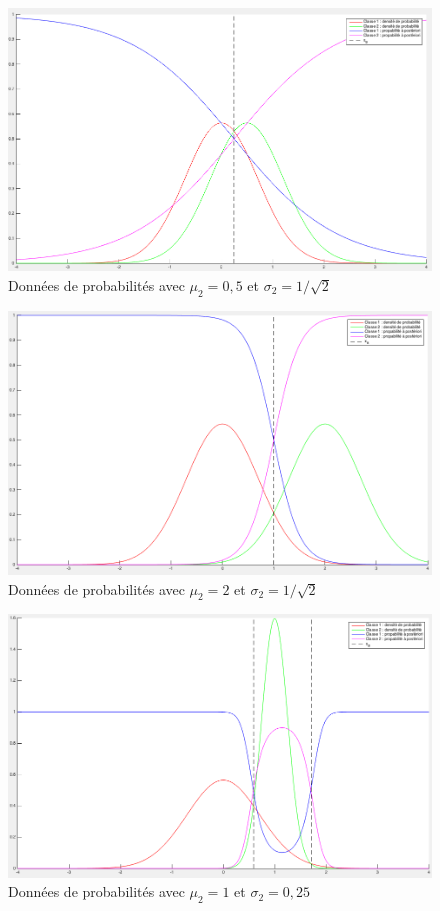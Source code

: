 \documentclass[11pt,a4paper]{article}
\begin{document}
\begin{figure}[H]
\center
\includegraphics[width=14cm]{exo1_graph_mu05.png}
\caption{Données de probabilités avec $\mu_2 = 0,5$ et $\sigma_2 = 1/\sqrt{2}$}
\end{figure}

\begin{figure}[H]
\center
\includegraphics[width=14cm]{exo1_graph_mu2.png}
\caption{Données de probabilités avec $\mu_2 = 2$ et $\sigma_2 = 1/\sqrt{2}$}
\end{figure}

\begin{figure}[H]
\center
\includegraphics[width=14cm]{exo1_graph_mu1_sigma025.png}
\caption{Données de probabilités avec $\mu_2 = 1$ et $\sigma_2 = 0,25$}
\end{figure}
\end{document}
